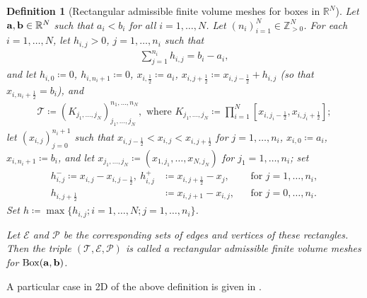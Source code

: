 \documentclass[oneside,11pt]{book}
\numberwithin{equation}{section}
\newtheorem{definition}{Definition}[section]
\begin{document}
\begin{definition}[Rectangular admissible finite volume meshes for boxes in $\mathbb{R}^N$]
    Let ${\bf a},{\bf b}\in\mathbb{R}^N$ such that $a_i < b_i$ for all $i = 1,\ldots,N$. Let $(n_i)_{i=1}^N\in\mathbb{Z}_{> 0}^N$. For each $i = 1,\ldots,N$, let $h_{i,j} > 0$, $j = 1,\ldots,n_i$ such that
    \begin{align*}
        \sum_{j=1}^{n_i} h_{i,j} = b_i - a_i,
    \end{align*}
    and let $h_{i,0}\coloneqq 0$, $h_{i,n_i+1}\coloneqq 0$, $x_{i,\frac{1}{2}}\coloneqq a_i$, $x_{i,j+\frac{1}{2}}\coloneqq x_{i,j-\frac{1}{2}} + h_{i,j}$ (so that $x_{i,n_i+\frac{1}{2}} = b_i$), and
    \begin{align*}
        \mathcal{T}\coloneqq(K_{j_1,\ldots,j_N})_{j_1,\ldots,j_N}^{n_1,\ldots,n_N},\mbox{ where } K_{j_1,\ldots,j_N}\coloneqq\prod_{i=1}^N [x_{i,j_i-\frac{1}{2}},x_{i,j_i+\frac{1}{2}}];
    \end{align*}
    let $(x_{i,j})_{j=0}^{n_i+1}$ such that $x_{i,j-\frac{1}{2}} < x_{i,j} < x_{i,j+\frac{1}{2}}$ for $j = 1,\ldots,n_i$, $x_{i,0}\coloneqq a_i$, $x_{i,n_i+1}\coloneqq b_i$, and let $x_{j_1,\ldots,j_N}\coloneqq(x_{1,j_1},\ldots,x_{N,j_N})$ for $j_1 = 1,\ldots,n_i$; set
    \begin{equation*}
        \left.\begin{split}
            h_{i,j}^-\coloneqq x_{i,j} - x_{i,j-\frac{1}{2}},\ h_{i,j}^+&\coloneqq x_{i,j+\frac{1}{2}} - x_j,&&\mbox{for } j = 1,\ldots,n_i,\\
            h_{i,j+\frac{1}{2}}&\coloneqq x_{i,j+1} - x_{i,j},&&\mbox{for } j = 0,\ldots,n_i.
        \end{split}\right.
    \end{equation*}
    Set $h\coloneqq\max\{h_{i,j};i = 1,\ldots,N;j = 1,\ldots,n_i\}$.
    
    Let $\mathcal{E}$ and $\mathcal{P}$ be the corresponding sets of edges and vertices of these rectangles. Then the triple $(\mathcal{T},\mathcal{E},\mathcal{P})$ is called a rectangular admissible finite volume meshes for $\operatorname{Box}({\bf a},{\bf b})$.
\end{definition}
A particular case in 2D of the above definition is given in \cite{Eymard_Gallouet_Herbin2019}.
\end{document}
